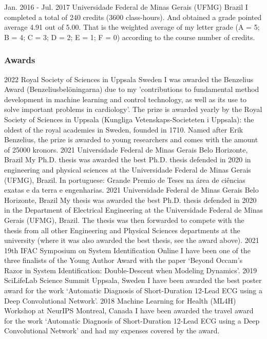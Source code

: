 \documentclass[10pt,letterpaper]{article} %
\begin{document}
    { Jan. 2016 - Jul. 2017 }
    { Universidade Federal de Minas Gerais (UFMG) }
    { Brazil }
    { I completed a total of 240  credits (3600 class-hours). And obtained a grade pointed average 4.91 out of 5.00. That is the weighted average of my letter grade (A = 5; B = 4; C = 3; D = 2; E = 1; F = 0) according to the course number of credits. }


\subsubsection*{Awards}


    { 2022 }
    { Royal Society of Sciences in Uppsala }
    { Sweden }
    { I was awarded the Benzelius Award (Benzeliusbelöningarna) due to my 'contributions to fundamental method development in machine learning and control technology, as well as its use to solve important problems in cardiology'. The prize is awarded yearly by the Royal Society of Sciences in Uppsala (Kungliga Vetenskaps-Societeten i Uppsala): the oldest of the royal academies in Sweden, founded in 1710. Named after Erik Benzelius, the prize is awarded to young researchers and comes with the amount of 25000 kronors. }
    { 2021 }
    { Universidade Federal de Minas Gerais }
    { Belo Horizonte, Brazil }
    { My Ph.D. thesis was awarded the best Ph.D. thesis defended in 2020 in engineering and physical sciences at the Universidade Federal de Minas Gerais (UFMG), Brazil. In portuguese: Grande Premio de Teses na área de ciências exatas e da terra e engenharias. }
    { 2021 }
    { Universidade Federal de Minas Gerais }
    { Belo Horizonte, Brazil }
    { My thesis was awarded the best Ph.D. thesis defended in 2020 in the Department of Electrical Engineering at the Universidade Federal de Minas Gerais (UFMG), Brazil. The thesis was then forwarded to compete with the thesis from all other Engineering and Physical Sciences departments at the university (where it was also awarded the best thesis, see the award above). }
    { 2021 }
    { 19th IFAC Symposium on System Identification }
    { Online }
    { I have been one of the three finalists of the Young Author Award with the paper `Beyond Occam’s Razor in System Identification:  Double-Descent when Modeling Dynamics'. }
    { 2019 }
    { SciLifeLab Science Summit }
    { Uppsala, Sweden }
    { I have been awarded the best poster award for the work `Automatic Diagnosis of Short-Duration 12-Lead ECG using a Deep Convolutional Network'. }
    { 2018 }
    { Machine Learning for Health (ML4H) Workshop at NeurIPS }
    { Montreal, Canada }
    { I have been awarded the travel award for the work `Automatic Diagnosis of Short-Duration 12-Lead ECG using a Deep Convolutional Network' and had my expenses covered by the award. }
\end{document}
